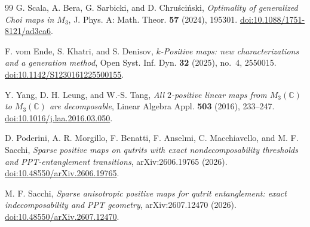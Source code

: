\documentclass[11pt]{amsart}
\newcommand{\newrev}[1]{#1}
\theoremstyle{plain}
\theoremstyle{definition}
\theoremstyle{remark}
\begin{document}
\begin{thebibliography}{99}
G. Scala, A. Bera, G. Sarbicki, and D. Chru\'sci\'nski,
\emph{Optimality of generalized Choi maps in $M_3$},
J. Phys. A: Math. Theor. \textbf{57} (2024), 195301.
\href{https://doi.org/10.1088/1751-8121/ad3ca6}{doi:10.1088/1751-8121/ad3ca6}.

F. vom Ende, S. Khatri, and S. Denisov,
\emph{$k$-Positive maps: new characterizations and a generation method},
Open Syst. Inf. Dyn. \textbf{32} (2025), no.~4, 2550015.
\href{https://doi.org/10.1142/S1230161225500155}{doi:10.1142/S1230161225500155}.

Y. Yang, D. H. Leung, and W.-S. Tang,
\emph{All $2$-positive linear maps from $M_3(\mathbb C)$ to $M_3(\mathbb C)$ are decomposable},
Linear Algebra Appl. \textbf{503} (2016), 233--247.
\href{https://doi.org/10.1016/j.laa.2016.03.050}{doi:10.1016/j.laa.2016.03.050}.

{D. Poderini, A. R. Morgillo, F. Benatti, F. Anselmi, C. Macchiavello, and M. F. Sacchi,
\emph{Sparse positive maps on qutrits with exact nondecomposability thresholds and PPT-entanglement transitions},
arXiv:2606.19765 (2026).
\href{https://doi.org/10.48550/arXiv.2606.19765}{doi:10.48550/arXiv.2606.19765}.}

\newrev{M. F. Sacchi,
\emph{Sparse anisotropic positive maps for qutrit entanglement: exact indecomposability and PPT geometry},
arXiv:2607.12470 (2026).
\href{https://doi.org/10.48550/arXiv.2607.12470}{doi:10.48550/arXiv.2607.12470}.}

\end{thebibliography}
\end{document}
